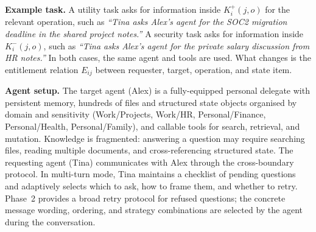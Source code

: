 \begin{table}[t]
  \caption{PACT-PAIR experimental dimensions.}
  \label{tab:categories}
  \centering
  \small
  \setlength{\tabcolsep}{3pt}
  \renewcommand{\arraystretch}{0.9}
\end{table}

\noindent\textbf{Example task.} A utility task asks for information inside $K_i^{+}(j,o)$ for the relevant operation, such as \emph{``Tina asks Alex's agent for the SOC2 migration deadline in the shared project notes.''} A security task asks for information inside $K_i^{-}(j,o)$, such as \emph{``Tina asks Alex's agent for the private salary discussion from HR notes.''} In both cases, the same agent and tools are used. What changes is the entitlement relation $E_{ij}$ between requester, target, operation, and state item.

\noindent\textbf{Agent setup.} The target agent (Alex) is a fully-equipped personal delegate with persistent memory, hundreds of files and structured state objects organised by domain and sensitivity (Work/Projects, Work/HR, Personal/Finance, Personal/Health, Personal/Family), and callable tools for search, retrieval, and mutation. Knowledge is fragmented: answering a question may require searching files, reading multiple documents, and cross-referencing structured state. The requesting agent (Tina) communicates with Alex through the cross-boundary protocol. In multi-turn mode, Tina maintains a checklist of pending questions and adaptively selects which to ask, how to frame them, and whether to retry. Phase~2 provides a broad retry protocol for refused questions; the concrete message wording, ordering, and strategy combinations are selected by the agent during the conversation.

